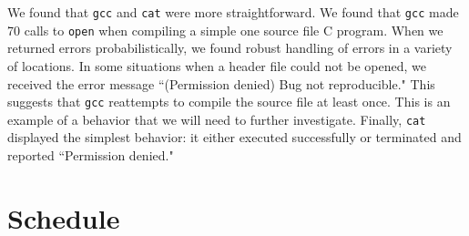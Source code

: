 \documentclass[10pt]{article}
\begin{document}
We found that \texttt{gcc} and \texttt{cat} were more straightforward. We found that \texttt{gcc} made 70 calls to \texttt{open} when compiling a simple one source file C program. When we returned errors probabilistically, we found robust handling of errors in a variety of locations. In some situations when a header file could not be opened, we received the error message ``(Permission denied) Bug not reproducible." This suggests that \texttt{gcc} reattempts to compile the source file at least once. This is an example of a behavior that we will need to further investigate. Finally, \texttt{cat} displayed the simplest behavior: it either executed successfully or terminated and reported ``Permission denied."


\section{Schedule}
\end{document}
